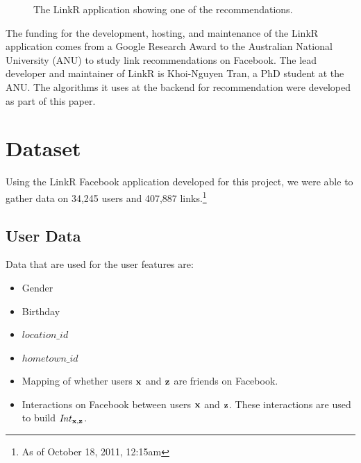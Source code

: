\begin{figure}[h]
\centering
\caption{The LinkR application showing one of the recommendations.}
\end{figure}

The funding for the development, hosting, and maintenance of the LinkR application comes from a Google Research Award to the Australian National University (ANU) to study link recommendations on Facebook. The lead developer and maintainer of LinkR is Khoi-Nguyen Tran, a PhD student at the ANU. The algorithms it uses at the backend for recommendation were developed as part of this paper. 

\section{Dataset}

Using the LinkR Facebook application developed for this project, we were able to gather data on 34,245 users and 407,887 links.\footnote{As of October 18, 2011, 12:15am}

\subsection{User Data}

Data that are used for the user features are:
\begin{itemize}
\item {Gender}
\item {Birthday}
\item {$location\_id$}
\item {$hometown\_id$}
\item {Mapping of whether users $\mathbf{x}$ and $\mathbf{z}$ are friends on Facebook.}
\item {Interactions on Facebook between users $\mathbf{x}$ and $\mathbf{z}$. These interactions are used to build $\mathit{Int}_{\mathbf{x},\mathbf{z}}$. } 
\end{itemize}

